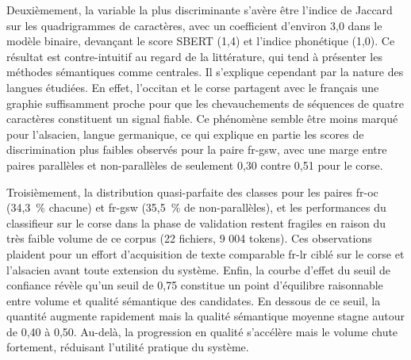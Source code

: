 Deuxièmement, la variable
la plus discriminante s'avère être l'indice de Jaccard sur les quadrigrammes de caractères, avec un coefficient d'environ 3,0 dans
le modèle binaire, devançant le score SBERT (1,4) et l'indice phonétique (1,0). Ce résultat est contre-intuitif au regard de la littérature,
qui tend à présenter les méthodes sémantiques comme centrales. Il s'explique cependant par la nature des langues étudiées. En effet, l'occitan et le
corse partagent avec le français une graphie suffisamment proche pour que les chevauchements de
séquences de quatre caractères constituent un signal fiable. Ce phénomène semble être moins marqué pour l'alsacien, langue germanique, ce qui
explique en partie les scores de discrimination plus faibles observés pour la paire fr-gsw, avec une marge entre paires parallèles et
non-parallèles de seulement 0,30 contre 0,51 pour le corse.

Troisièmement, la distribution quasi-parfaite des classes pour les paires
fr-oc (34,3~\% chacune) et fr-gsw (35,5~\% de non-parallèles), et les performances du
classifieur sur le corse dans la phase de validation 
restent fragiles en raison du très faible volume de ce corpus (22 fichiers, 9 004 tokens).
Ces observations plaident pour un effort d'acquisition de texte comparable fr-lr ciblé sur le corse et l'alsacien avant toute extension du système.
Enfin, la courbe d'effet
du seuil de confiance révèle qu'un seuil de 0,75 constitue un point d'équilibre raisonnable entre volume et qualité
sémantique des candidates. En dessous de
ce seuil, la quantité augmente rapidement mais la qualité sémantique moyenne stagne autour de 0,40 à 0,50. Au-delà, la progression en qualité
s'accélère mais le volume chute fortement, réduisant l'utilité pratique du système.